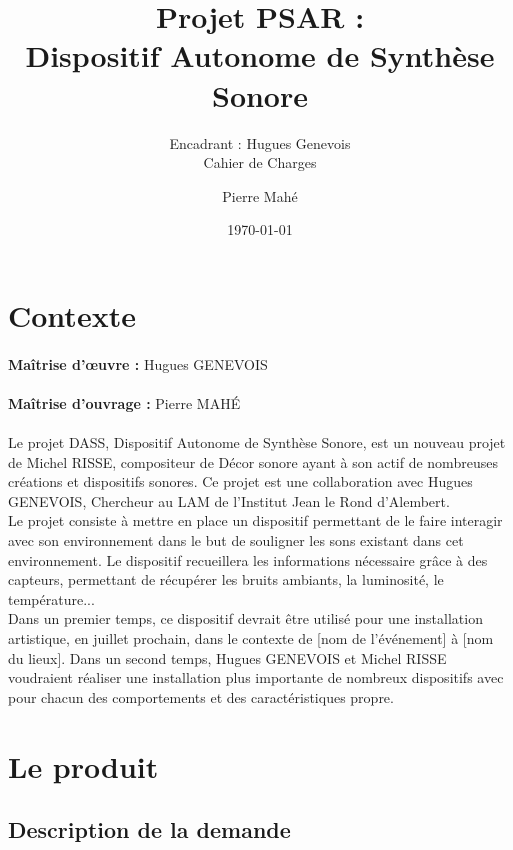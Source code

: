 \documentclass[a4paper, titlepage, oneside, 12pt]{article}%
\title{Projet PSAR :\\ Dispositif Autonome de Synthèse Sonore}
\subtitle{Encadrant : Hugues Genevois \\ Cahier de Charges}
\author{Pierre Mahé}
\date{\today}
\begin{document}
 
\maketitle 
\tableofcontents

\newpage

\section{Contexte}

\paragraph{}
\textbf{Maîtrise d’œuvre :} Hugues GENEVOIS
\vspace{-5mm}
\paragraph{}
\textbf{Maîtrise d’ouvrage :} Pierre MAHÉ

\paragraph{}
Le projet DASS, Dispositif Autonome de Synthèse Sonore, est un nouveau projet de Michel RISSE, compositeur de Décor sonore ayant à son actif de nombreuses créations et dispositifs sonores. Ce projet est une collaboration avec Hugues GENEVOIS, Chercheur au LAM de l’Institut Jean le Rond d’Alembert.\\

Le projet consiste à mettre en place un dispositif permettant de le faire interagir avec son environnement dans le but de souligner les sons existant dans cet environnement.
Le dispositif recueillera les informations nécessaire grâce à des capteurs, permettant de récupérer les bruits ambiants, la luminosité, le température...\\

Dans un premier temps, ce dispositif devrait être utilisé pour une installation artistique, en juillet prochain, dans le contexte de [nom de l’événement] à [nom du lieux].
Dans un second temps, Hugues GENEVOIS et Michel RISSE voudraient réaliser une installation plus importante de nombreux dispositifs avec pour chacun des comportements et des caractéristiques propre.

\section{Le produit}
\subsection{Description de la demande}
\end{document}
